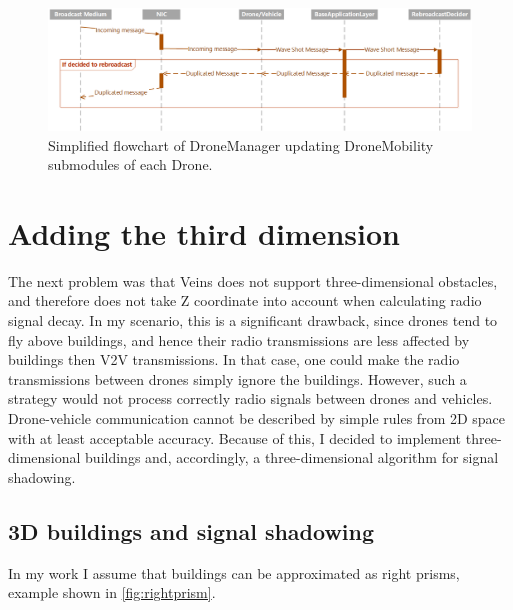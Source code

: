 \documentclass[]{nsm-thesis}
\begin{document}
\begin{figure}
	\centering
	\includegraphics[width=1\textwidth]{figures/RebroadcastDecider.png}
	\caption{Simplified flowchart of DroneManager updating DroneMobility submodules of each Drone.}
	\label{fig:rebroadcastdeciderseq}
\end{figure}



\section{Adding the third dimension}

The next problem was that Veins does not support three-dimensional obstacles, and therefore does not take Z coordinate into account when calculating radio signal decay. In my scenario, this is a significant drawback, since drones tend to fly above buildings, and hence their radio transmissions are less affected by buildings then \ac{V2V} transmissions. In that case, one could make the radio transmissions between drones simply ignore the buildings. However, such a strategy would not process correctly radio signals between drones and vehicles. Drone-vehicle communication cannot be described by simple rules from 2D space with at least acceptable accuracy. Because of this, I decided to implement three-dimensional buildings and, accordingly, a three-dimensional algorithm for signal shadowing.



\subsection{3D buildings and signal shadowing}

In my work I assume that buildings can be approximated as right prisms, example shown in \cref{fig:rightprism}. 
\end{document}
